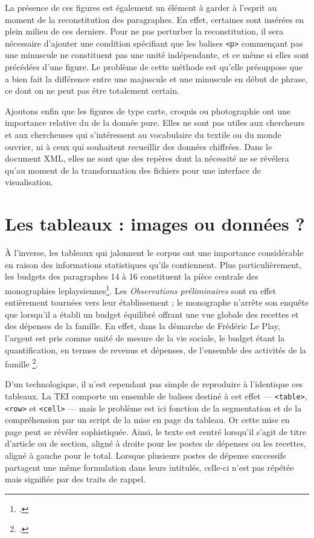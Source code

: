 La présence de ces figures est également un élément à garder à l'esprit au moment de la reconstitution des paragraphes. En effet, certaines sont insérées en plein milieu de ces derniers. Pour ne pas perturber la reconstitution, il sera nécessaire d'ajouter une condition spécifiant que les balises \texttt{<p>} commençant pas une minuscule ne constituent pas une unité indépendante, et ce même si elles sont précédées d'une figure. Le problème de cette méthode est qu'elle présuppose que \lse{} a bien fait la différence entre une majuscule et une minuscule en début de phrase, ce dont on ne peut pas être totalement certain.

Ajoutons enfin que les figures de type carte, croquis ou photographie ont une importance relative du \pov{} de la donnée pure. Elles ne sont pas utiles aux chercheurs et aux chercheuses qui s'intéressent au vocabulaire du textile ou du monde ouvrier, ni à ceux qui souhaitent recueillir des données chiffrées. Dans le document XML, elles ne sont que des repères dont la nécessité ne se révélera qu'au moment de la transformation des fichiers pour une interface de visualisation.

\section{Les tableaux : images ou données ?}

À l'inverse, les tableaux qui jalonnent le corpus ont une importance considérable en raison des informations statistiques qu'ils contiennent. Plus particulièrement, les budgets des paragraphes 14 à 16 constituent \og la pièce centrale \fg{} des monographies leplaysiennes\footcite[p. 317]{savoyecontinuateurs}. Les \textit{Observations préliminaires} sont en effet entièrement tournées vers leur établissement ; le monographe n'arrête son enquête que lorsqu'il a établi un budget équilibré offrant une vue globale des recettes et des dépenses de la famille. En effet, dans la démarche de Frédéric Le Play, \og l'argent est pris comme unité de mesure de la vie sociale, le budget étant la quantification, en termes de revenus et dépenses, de l'ensemble des activités de la famille \fg\footcite[p. 317]{savoyecontinuateurs}.

D'un \pov{} technologique, il n'est cependant pas simple de reproduire à l'identique ces tableaux. La TEI comporte un ensemble de balises destiné à cet effet --- \texttt{<table>}, \texttt{<row>} et \texttt{<cell>} --- mais le problème est ici fonction de la segmentation et de la compréhension par un script de la mise en page du tableau. Or cette mise en page peut se révéler sophistiquée. Ainsi, le texte est centré lorsqu'il s'agit de titre d'article ou de section, aligné à droite pour les postes de dépenses ou les recettes, aligné à gauche pour le total. Lorsque plusieurs postes de dépense successifs partagent une même formulation dans leurs intitulés, celle-ci n'est pas répétée mais signifiée par des traits de rappel.

